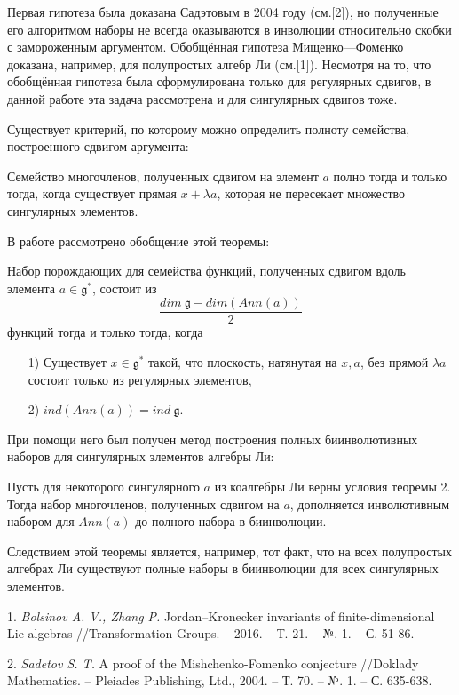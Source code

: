      Первая гипотеза была доказана Садэтовым в 2004 году (см.[2]), но полученные его алгоритмом наборы не всегда оказываются в инволюции относительно скобки с замороженным аргументом.
Обобщённая гипотеза Мищенко---Фоменко доказана, например, для полупростых алгебр Ли (см.[1]). Несмотря на то, что обобщённая гипотеза была сформулирована только для регулярных сдвигов, в данной работе эта задача рассмотрена и для сингулярных сдвигов тоже.


Существует критерий, по которому можно определить полноту семейства, построенного сдвигом аргумента:
\begin{theorem}
Семейство многочленов, полученных сдвигом на элемент $a$ полно тогда и только тогда, когда существует прямая $x+\lambda a$, которая не пересекает множество сингулярных элементов.
\end{theorem}
В работе рассмотрено обобщение этой теоремы:
\begin{theorem}
Набор порождающих для семейства функций, полученных сдвигом вдоль элемента $a\in \mathfrak{g}^*$, состоит из
$$\frac{dim \  \mathfrak{g}- dim (Ann(a))} 2$$
функций тогда и только тогда, когда
\begin{itemize}
    \item [1)] Существует $x\in \mathfrak{g}^*$ такой, что плоскость, натянутая на $x,a$, без прямой $\lambda a$ состоит только из регулярных элементов,
    \item[2)] $ind(Ann(a))=ind \  \mathfrak{g}$.
\end{itemize}
\end{theorem}
При помощи него был получен метод построения полных биинволютивных наборов для сингулярных элементов алгебры Ли:
\begin{theorem}
Пусть для некоторого сингулярного $a$ из коалгебры Ли верны условия теоремы 2.
Тогда набор многочленов, полученных сдвигом на $a$,  дополняется инволютивным набором для $Ann(a)$ до полного набора в биинволюции.
\end{theorem}
Следствием этой теоремы является, например, тот факт, что на всех полупростых алгебрах Ли существуют полные наборы в биинволюции для всех сингулярных элементов.
\litlist

1. {\it Bolsinov A. V., Zhang P.} Jordan–Kronecker invariants of finite-dimensional Lie algebras //Transformation Groups. – 2016. – Т. 21. – №. 1. – С. 51-86.

2. {\it Sadetov S. T.} A proof of the Mishchenko-Fomenko conjecture //Doklady Mathematics. – Pleiades Publishing, Ltd., 2004. – Т. 70. – №. 1. – С. 635-638.
